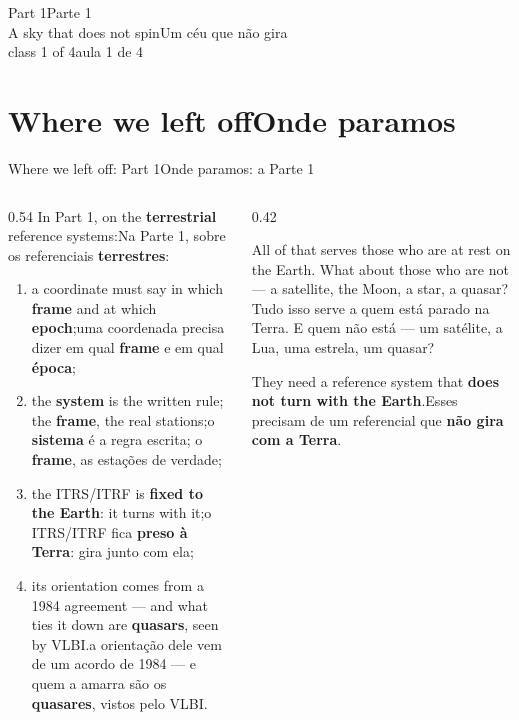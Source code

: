 \documentclass[aspectratio=169,11pt]{beamer}
\newcommand{\tr}[2]{\ifEN#2\else#1\fi}
\newcommand{\bnum}[1]{\textbf{\textcolor{mTeal}{#1}}}
\newcommand{\sist}[1]{\textcolor{corSist}{\textbf{#1}}}
\newcommand{\fram}[1]{\textcolor{corFrame}{\textbf{#1}}}
\begin{document}
\begin{frame}[standout]
  \tr{Parte 1}{Part 1}\\[6pt]
  {\normalsize \tr{Um céu que não gira}{A sky that does not spin}}\\[4pt]
  {\scriptsize \tr{aula 1 de 4}{class 1 of 4}}
\end{frame}

\section{\tr{Onde paramos}{Where we left off}}

\begin{frame}{\tr{Onde paramos: a Parte 1}{Where we left off: Part 1}}
  \begin{columns}[T]
    \begin{column}{0.54\textwidth}
      \tr{Na Parte 1, sobre os referenciais \bnum{terrestres}:}{In Part 1, on the
      \bnum{terrestrial} reference systems:}
      \begin{enumerate}
        \setlength{\itemsep}{4pt}
        \item \tr{uma coordenada precisa dizer em qual \bnum{frame} e em qual
              \bnum{época};}{a coordinate must say in which \bnum{frame} and at which
              \bnum{epoch};}
        \item \tr{o \sist{sistema} é a regra escrita; o \fram{frame}, as estações de
              verdade;}{the \sist{system} is the written rule; the \fram{frame}, the real
              stations;}
        \item \tr{o ITRS/ITRF fica \bnum{preso à Terra}: gira junto com ela;}{the ITRS/ITRF is
              \bnum{fixed to the Earth}: it turns with it;}
        \item \tr{a orientação dele vem de um acordo de 1984 --- e quem a amarra são os
              \bnum{quasares}, vistos pelo VLBI.}{its orientation comes from a 1984 agreement
              --- and what ties it down are \bnum{quasars}, seen by VLBI.}
      \end{enumerate}
    \end{column}
    \begin{column}{0.42\textwidth}
      \begin{cuidado}[title={\tr{Ficou faltando uma peça}{One piece is missing}}]
        \tr{Tudo isso serve a quem está \alert{parado na Terra}. E quem não está --- um
        satélite, a Lua, uma estrela, um quasar?}{All of that serves those who are \alert{at
        rest on the Earth}. What about those who are not --- a satellite, the Moon, a star, a
        quasar?}
        \medskip

        \tr{Esses precisam de um referencial que \bnum{não gira com a Terra}.}{They need a
        reference system that \bnum{does not turn with the Earth}.}
      \end{cuidado}
    \end{column}
  \end{columns}
\end{frame}
\end{document}

